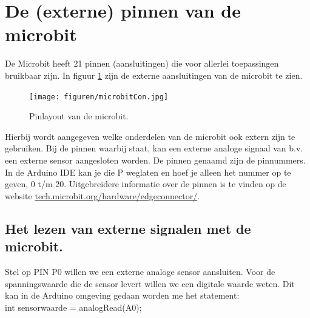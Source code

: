 \section{De (externe) pinnen van de microbit}
 
De Microbit heeft 21 pinnen (aansluitingen) die voor allerlei toepassingen bruikbaar zijn. In figuur \ref{fig:ardPinB} zijn de externe aansluitingen van de microbit te zien. 
\begin{figure}[h!]
	\captionsetup{justification=centering}
	\texttt{[image: figuren/microbitCon.jpg]}
	\centering
	\caption{Pinlayout van de microbit.}
	\label{fig:ardPinB}
\end{figure}
Hierbij wordt aangegeven welke onderdelen van de microbit ook extern zijn te gebruiken. Bij de pinnen waarbij  staat, kan een externe analoge signaal van b.v. een externe sensor aangesloten worden. De pinnen genaamd  zijn de pinnummers. In de Arduino IDE kan je die P weglaten en hoef je alleen het nummer op te geven, 0 t/m 20. Uitgebreidere informatie over de pinnen is te vinden op de website \href{https://tech.microbit.org/hardware/edgeconnector/}{tech.microbit.org/hardware/edgeconnector/}.\\

\subsection{Het lezen van externe signalen met de microbit.}

Stel op PIN P0 willen we een externe analoge sensor aansluiten. Voor de spanningswaarde die de sensor levert willen we een digitale waarde weten. 
Dit kan in de Arduino omgeving gedaan worden me het statement:\\

int sensorwaarde = \textcolor{arduinoOrange}{analogRead}(A0);

